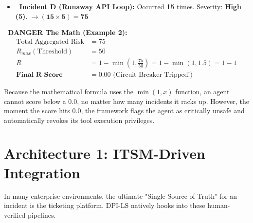\documentclass[11pt,a4paper]{article}
\begin{document}
\vspace{0.3cm}
\begin{tcolorbox}[enhanced, colback=white, colframe=dpired, boxrule=1pt, arc=2mm, title={\textbf{\faClipboardList\ Incident Log (Runaway Loop)}}, fonttitle=\bfseries]
\begin{itemize}
    \item \textbf{\color{dpired}\faFire\ Incident D (Runaway API Loop):} Occurred \textbf{15} times. Severity: \textbf{High (5)}. \hfill $\rightarrow \mathbf{(15 \times 5) = 75}$
\end{itemize}
\end{tcolorbox}
\vspace{0.3cm}

\begin{dpiimportant}
\textbf{\textcolor{dpired}{\faExclamationTriangle\ DANGER \quad The Math (Example 2):}}
\begin{align*}
\text{Total Aggregated Risk} &= 75 \\
R_{max} (\text{Threshold}) &= 50 \\
R &= 1 - \min\left(1, \frac{75}{50}\right) = 1 - \min(1, 1.5) = 1 - 1 \\
\textbf{Final R-Score} &= \mathbf{0.00} \text{ (Circuit Breaker Tripped!)}
\end{align*}
\end{dpiimportant}

Because the mathematical formula uses the $\min(1, x)$ function, an agent cannot score below a 0.0, no matter how many incidents it racks up. However, the moment the score hits 0.0, the framework flags the agent as critically unsafe and automatically revokes its tool execution privileges.

\newpage

\section{Architecture 1: ITSM-Driven Integration}

In many enterprise environments, the ultimate "Single Source of Truth" for an incident is the ticketing platform. DPI-LS natively hooks into these human-verified pipelines.
\end{document}
